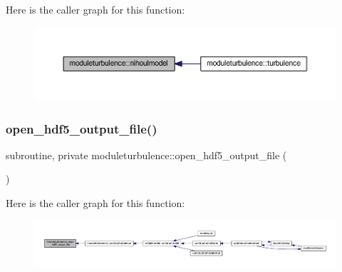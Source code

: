 Here is the caller graph for this function\+:\nopagebreak
\begin{figure}[H]
\begin{center}
\leavevmode
\includegraphics[width=350pt]{namespacemoduleturbulence_a403c337f711237d4bc2b5d439e974a19_icgraph}
\end{center}
\end{figure}
\mbox{\label{namespacemoduleturbulence_afa8dd99716d657032435779e03fff106}} 
\subsubsection{\texorpdfstring{open\+\_\+hdf5\+\_\+output\+\_\+file()}{open\_hdf5\_output\_file()}}
{\footnotesize\ttfamily subroutine, private moduleturbulence\+::open\+\_\+hdf5\+\_\+output\+\_\+file (\begin{DoxyParamCaption}{ }\end{DoxyParamCaption})\hspace{0.3cm}{\ttfamily [private]}}

Here is the caller graph for this function\+:\nopagebreak
\begin{figure}[H]
\begin{center}
\leavevmode
\includegraphics[width=350pt]{namespacemoduleturbulence_afa8dd99716d657032435779e03fff106_icgraph}
\end{center}
\end{figure}
\mbox{\label{namespacemoduleturbulence_a72996c619e984f58e135b17214de8718}} 
